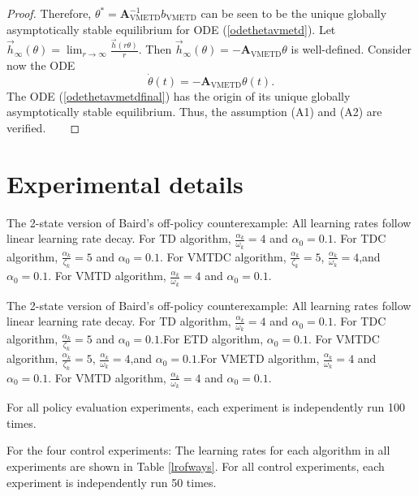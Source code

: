 \begin{proof}
 Therefore,
${\theta}^*=\textbf{A}_{\text{VMETD}}^{-1}{b}_{\text{VMETD}}$ can be seen to be the unique globally asymptotically
 stable equilibrium for ODE (\ref{odethetavmetd}).
 Let $\vec{h}_{\infty}({\theta})=\lim_{r\rightarrow
\infty}\frac{\vec{h}(r{\theta})}{r}$. Then
$\vec{h}_{\infty}({\theta})=-\textbf{A}_{\text{VMETD}}{\theta}$ is well-defined. 
 Consider now the ODE
\begin{equation}
 \dot{{\theta}}(t)=-\textbf{A}_{\text{VMETD}}{\theta}(t).
\label{odethetavmetdfinal}
\end{equation}
 The ODE (\ref{odethetavmetdfinal}) has the origin of its unique globally asymptotically stable equilibrium.
 Thus, the assumption (A1) and (A2) are verified.
    \end{proof}



\section{Experimental details}
\label{experimentaldetails}
The 2-state version of Baird's off-policy counterexample: All learning rates follow linear learning rate decay.
For TD algorithm, $\frac{\alpha_k}{\omega_k}=4$ and $\alpha_0 = 0.1$.
For TDC algorithm, $\frac{\alpha_k}{\zeta_k}=5$ and $\alpha_0 = 0.1$.
For VMTDC algorithm, $\frac{\alpha_k}{\zeta_k}=5$, $\frac{\alpha_k}{\omega_k}=4$,and $\alpha_0 = 0.1$.
For VMTD algorithm, $\frac{\alpha_k}{\omega_k}=4$ and $\alpha_0 = 0.1$.

The 2-state version of Baird's off-policy counterexample: All learning rates follow linear learning rate decay.
For TD algorithm, $\frac{\alpha_k}{\omega_k}=4$ and $\alpha_0 = 0.1$.
For TDC algorithm, $\frac{\alpha_k}{\zeta_k}=5$ and $\alpha_0 = 0.1$.For ETD algorithm, $\alpha_0 = 0.1$.
For VMTDC algorithm, $\frac{\alpha_k}{\zeta_k}=5$, $\frac{\alpha_k}{\omega_k}=4$,and $\alpha_0 = 0.1$.For VMETD algorithm, $\frac{\alpha_k}{\omega_k}=4$ and $\alpha_0 = 0.1$.
For VMTD algorithm, $\frac{\alpha_k}{\omega_k}=4$ and $\alpha_0 = 0.1$.

For all policy evaluation experiments, each experiment 
is independently run 100 times.

For the four control experiments: The learning rates for each 
algorithm in all experiments are shown in Table \ref{lrofways}.
For all control experiments, each experiment is independently run 50 times.

